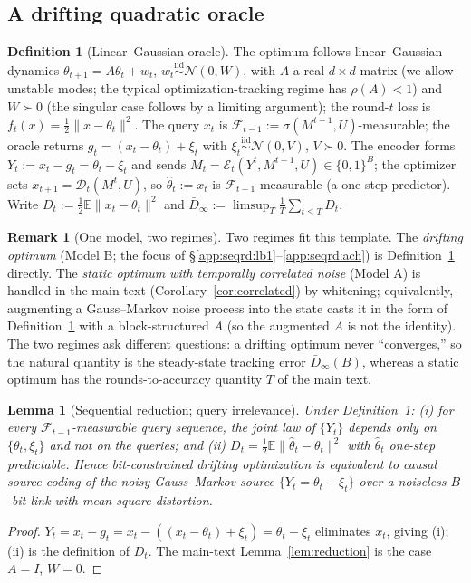 \documentclass[11pt]{article}
\newtheorem{lemma}{Lemma}
\theoremstyle{definition}
\newtheorem{definition}{Definition}
\newtheorem{remark}{Remark}
\newcommand{\E}{\mathbb{E}}
\newcommand{\Ncal}{\mathcal{N}}
\begin{document}
\subsection{A drifting quadratic oracle}\label{app:seqrd:setup}
\begin{definition}[Linear--Gaussian oracle]
\label{def:drift}
The optimum follows linear--Gaussian dynamics
$\theta_{t+1}=A\theta_t+w_t$, $w_t\stackrel{\mathrm{iid}}{\sim}\Ncal(0,W)$, with $A$ a real $d\times d$
matrix (we allow unstable modes; the typical optimization-tracking regime has $\rho(A)<1$) and
$W\succ0$ (the singular case follows by a limiting argument); the round-$t$ loss is
$f_t(x)=\tfrac12\|x-\theta_t\|^2$. The query $x_t$ is
$\mathcal F_{t-1}:=\sigma(M^{t-1},U)$-measurable; the oracle returns
$g_t=(x_t-\theta_t)+\xi_t$ with $\xi_t\stackrel{\mathrm{iid}}{\sim}\Ncal(0,V)$, $V\succ0$. The encoder
forms $Y_t:=x_t-g_t=\theta_t-\xi_t$ and sends $M_t=\mathcal E_t(Y^t,M^{t-1},U)\in\{0,1\}^B$; the
optimizer sets $x_{t+1}=\mathcal D_t(M^t,U)$, so $\hat\theta_t:=x_t$ is $\mathcal F_{t-1}$-measurable
(a one-step predictor). Write $D_t:=\tfrac12\E\|x_t-\theta_t\|^2$ and
$\bar D_\infty:=\limsup_{T}\tfrac1T\sum_{t\le T}D_t$.
\end{definition}

\begin{remark}[One model, two regimes]
\label{rem:augment}
Two regimes fit this template. The \emph{drifting optimum} (Model B; the focus of
\S\ref{app:seqrd:lb1}--\ref{app:seqrd:ach}) is Definition~\ref{def:drift} directly. The \emph{static
optimum with temporally correlated noise} (Model A) is handled in the main text
(Corollary~\ref{cor:correlated}) by whitening; equivalently, augmenting a Gauss--Markov noise process
into the state casts it in the form of Definition~\ref{def:drift} with a block-structured $A$ (so the
augmented $A$ is not the identity). The two regimes ask different questions: a drifting optimum never
``converges,'' so the natural quantity is the steady-state tracking error $\bar D_\infty(B)$, whereas a
static optimum has the rounds-to-accuracy quantity $T$ of the main text.
\end{remark}

\begin{lemma}[Sequential reduction; query irrelevance]
\label{lem:seqreduce}
Under Definition~\ref{def:drift}: (i) for every $\mathcal F_{t-1}$-measurable query sequence, the joint
law of $\{Y_t\}$ depends only on $\{\theta_t,\xi_t\}$ and not on the queries; and (ii)
$D_t=\tfrac12\E\|\hat\theta_t-\theta_t\|^2$ with $\hat\theta_t$ one-step predictable. Hence bit-constrained
drifting optimization is equivalent to causal source coding of the noisy Gauss--Markov source
$\{Y_t=\theta_t-\xi_t\}$ over a noiseless $B$-bit link with mean-square distortion.
\end{lemma}
\begin{proof}
$Y_t=x_t-g_t=x_t-((x_t-\theta_t)+\xi_t)=\theta_t-\xi_t$ eliminates $x_t$, giving (i); (ii) is the
definition of $D_t$. The main-text Lemma~\ref{lem:reduction} is the case $A=I$, $W=0$.
\end{proof}
\end{document}
